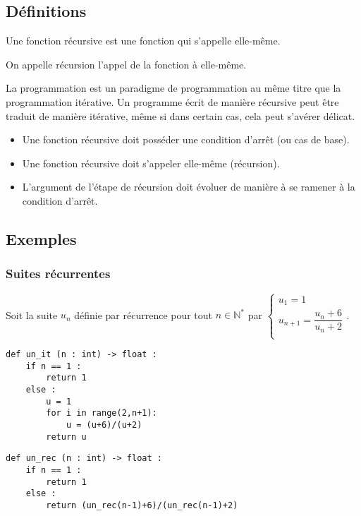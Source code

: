 \subsection*{Définitions}
\begin{defi}%
Une fonction récursive est une fonction qui s'appelle elle-même.

On appelle récursion l'appel de la fonction à elle-même.
\end{defi}

La programmation est un paradigme de programmation au même titre que la programmation itérative. Un programme écrit de manière récursive peut être traduit de manière itérative, même si dans certain cas, cela peut s'avérer délicat.


\begin{methode}
\begin{itemize}
\item Une fonction récursive doit posséder une condition d'arrêt (ou cas de base).
\item Une fonction récursive doit s'appeler elle-même (récursion).
\item L'argument de l'étape de récursion doit évoluer de manière à se ramener à la condition d'arrêt.
\end{itemize}
\end{methode}
 
 


\subsection*{Exemples}

\subsubsection*{Suites récurrentes}
Soit la suite $u_n$ définie par récurrence pour tout $n\in\mathbb{N}^*$ par 
$
\left\{
\begin{array}{ll} 
u_1 = 1 \\
u_{n+1} = \dfrac{u_n + 6}{u_n + 2} \\
\end{array}
\right.
$.

\noindent\begin{minipage}[c]{.45\linewidth}
\begin{lstlisting}
def un_it (n : int) -> float :
    if n == 1 :
        return 1
    else : 
        u = 1
        for i in range(2,n+1):
            u = (u+6)/(u+2)
        return u
\end{lstlisting}
\end{minipage} \hfill
\begin{minipage}[c]{.45\linewidth}
\begin{lstlisting}
def un_rec (n : int) -> float :
    if n == 1 :
        return 1
    else : 
        return (un_rec(n-1)+6)/(un_rec(n-1)+2)
\end{lstlisting}
\end{minipage} 

